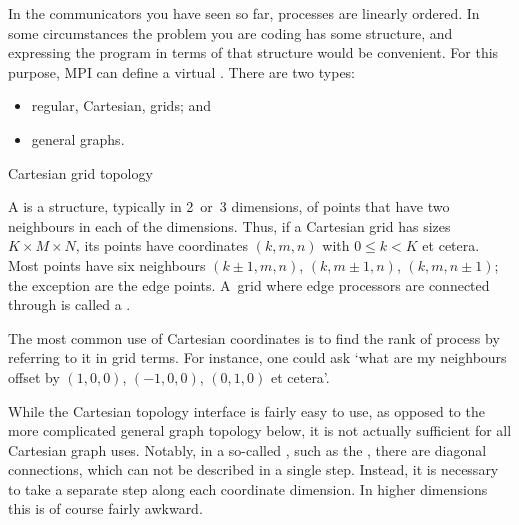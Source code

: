 
In the communicators you have seen so far, processes are linearly ordered.
In some circumstances the problem you are coding has some structure,
and expressing the program
in terms of that structure would be convenient. For this purpose, MPI 
can define a virtual . There are two types:
\begin{itemize}
\item regular, Cartesian, grids; and
\item general graphs.
\end{itemize}


 {Cartesian grid topology}
\label{sec:cartesian}

A  is a structure, typically in 2~or~3 dimensions,
of points that have two neighbours in each of the dimensions.
Thus, if a Cartesian grid has sizes $K\times M\times N$, its
points have coordinates $(k,m,n)$ with $0\leq k<K$ et cetera.
Most points have six neighbours $(k\pm1,m,n)$, $(k,m\pm1,n)$, $(k,m,n\pm1)$;
the exception are the edge points. A~grid where edge processors
are connected through  is called
a .

The most common use of Cartesian coordinates
is to find the rank of process by referring to it in grid terms.
For instance, one could ask `what are my neighbours offset by $(1,0,0)$, 
$(-1,0,0)$, $(0,1,0)$ et cetera'.

While the Cartesian topology interface is fairly easy to use, as
opposed to the more complicated general graph topology below, it is
not actually sufficient for all Cartesian graph uses. Notably, in
a so-called , such as the
, there are diagonal connections,
which can not be described in a single step. Instead, it is necessary
to take a separate step along each coordinate dimension. In higher
dimensions this is of course fairly awkward.

